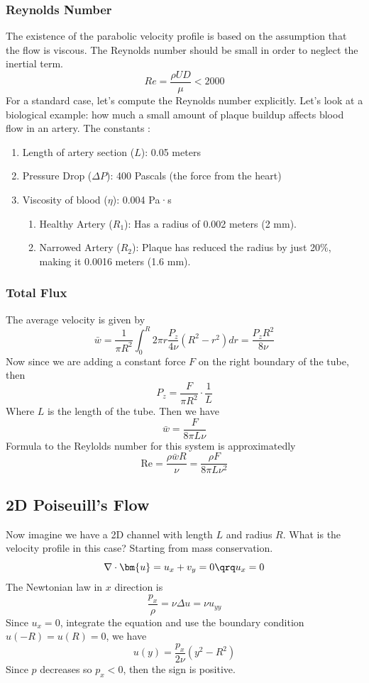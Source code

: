 \documentclass[../Immersed_Boundary_Method.tex]{subfiles}
\begin{document}
\subsubsection{Reynolds Number}
The existence of the parabolic velocity profile is based on the assumption that the flow is viscous. The Reynolds number should be small in order to neglect the inertial term. 
\begin{equation}
Re = \frac{\rho U D}{\mu} < 2000
\end{equation}
For a standard case, let's compute the Reynolds number explicitly. Let's look at a biological example: how much a small amount of plaque buildup affects blood flow in an artery. The constants : 
\begin{enumerate}
    \item Length of artery section ($L$): 0.05 meters
    \item Pressure Drop ($\Delta P$): 400 Pascals (the force from the heart)
    \item Viscosity of blood ($\eta$): 0.004 Pa·s
    \begin{enumerate}
        \item Healthy Artery ($R_1$): Has a radius of 0.002 meters (2 mm).
        \item Narrowed Artery ($R_2$): Plaque has reduced the radius by just 20\%, making it 0.0016 meters (1.6 mm).
    \end{enumerate}
\end{enumerate}
\subsubsection{Total Flux}
The average velocity is given by 
\[ \bar{w} = \frac{1}{\pi R^2} \int_{0}^{R}2\pi r \frac{P_z}{4\nu}(R^2 - r^2)dr = \frac{P_z R^2}{8\nu}\]
Now since we are adding a constant force $F$ on the right boundary of the tube, then 
\[ P_z = \frac{F}{\pi R^2} \cdot \frac{1}{L}\]
Where $L$ is the length of the tube. Then we have 
\[ \bar{w} = \frac{F}{8 \pi L \nu}\]
Formula to the Reylolds number for this system is approximatedly 
\[ \text{Re} = \frac{\rho \bar{w} R}{\nu} = \frac{\rho F}{8 \pi L \nu^2}\]

\subsection{2D Poiseuill's Flow}
Now imagine we have a 2D channel with length $L$ and radius $R$. What is the velocity profile in this case? Starting from mass conservation. 
\[ \nabla \cdot \bm{u} = u_x + v_y = 0 \qrq u_x = 0\]
The Newtonian law in $x$ direction is 
\[ \frac{p_x}{\rho} = \nu \Delta u = \nu u_{yy}\]
Since $u_x = 0$, integrate the equation and use the boundary condition $u(-R) = u(R) = 0$, we have 
\begin{equation}
 \boxed{u(y) = \frac{p_x}{2\nu}(y^2 - R^2)}
\end{equation}
Since $p$ decreases so $p_x < 0$, then the sign is positive. 
\end{document}
